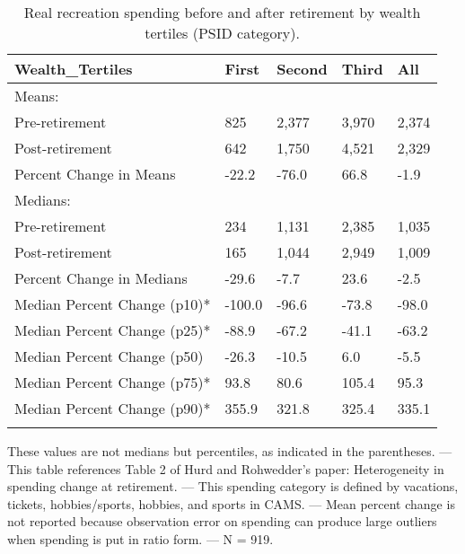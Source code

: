 \begin{table}[tbp] \centering
{}

\caption{Real recreation spending before and after retirement by wealth tertiles (PSID category).}
\begin{tabularx}{\textwidth}{lCCCC}

\toprule
{Wealth\_Tertiles}&{First}&{Second}&{Third}&{All} \tabularnewline
\midrule\addlinespace[1.5ex]
Means:&&&& \tabularnewline
\midrule Pre-retirement&825&2,377&3,970&2,374 \tabularnewline
Post-retirement&642&1,750&4,521&2,329 \tabularnewline
Percent Change in Means&-22.2&-76.0&66.8&-1.9 \tabularnewline
\midrule Medians:&&&& \tabularnewline
\midrule Pre-retirement&234&1,131&2,385&1,035 \tabularnewline
Post-retirement&165&1,044&2,949&1,009 \tabularnewline
Percent Change in Medians&-29.6&-7.7&23.6&-2.5 \tabularnewline
Median Percent Change (p10)*&-100.0&-96.6&-73.8&-98.0 \tabularnewline
Median Percent Change (p25)*&-88.9&-67.2&-41.1&-63.2 \tabularnewline
Median Percent Change (p50)&-26.3&-10.5&6.0&-5.5 \tabularnewline
Median Percent Change (p75)*&93.8&80.6&105.4&95.3 \tabularnewline
Median Percent Change (p90)*&355.9&321.8&325.4&335.1 \tabularnewline
\bottomrule \addlinespace[1.5ex]

\end{tabularx}
\begin{flushleft}
\footnotesize *These values are not medians but percentiles, as indicated in the parentheses. \linebreak --- \linebreak This table references Table 2 of Hurd and Rohwedder's paper: Heterogeneity in spending change at retirement. \linebreak --- \linebreak This spending category is defined by vacations, tickets, hobbies/sports, hobbies, and sports in CAMS. \linebreak --- \linebreak Mean percent change is not reported because observation error on spending can produce large outliers when spending is put in ratio form. \linebreak --- \linebreak N = 919.
\end{flushleft}
\end{table}
